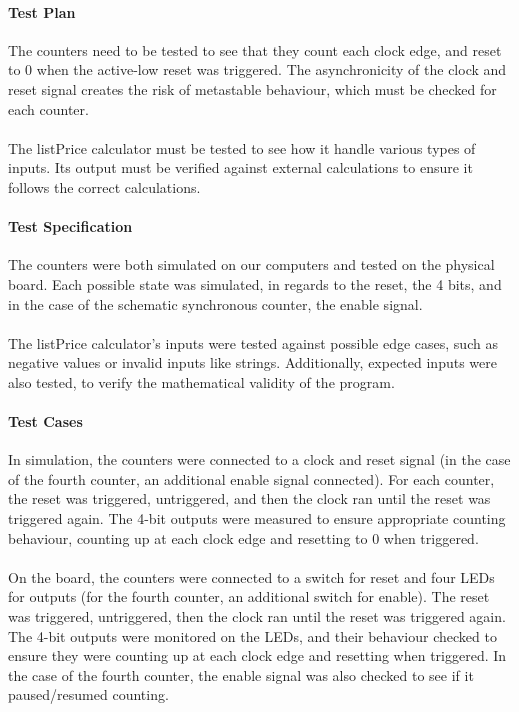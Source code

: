 \documentclass{article}
\begin{document}
  \paragraph{Test Plan} The counters need to be tested to see that they count each clock edge, and reset to 0 when the active-low reset was triggered. The asynchronicity of the clock and reset signal creates the risk of metastable behaviour, which must be checked for each counter.

  \paragraph{} The listPrice calculator must be tested to see how it handle various types of inputs. Its output must be verified against external calculations to ensure it follows the correct calculations.

  \paragraph{Test Specification} The counters were both simulated on our computers and tested on the physical board. Each possible state was simulated, in regards to the reset, the 4 bits, and in the case of the schematic synchronous counter, the enable signal.

  \paragraph{} The listPrice calculator's inputs were tested against possible edge cases, such as negative values or invalid inputs like strings. Additionally, expected inputs were also tested, to verify the mathematical validity of the program.

  \paragraph{Test Cases} In simulation, the counters were connected to a clock and reset signal (in the case of the fourth counter, an additional enable signal connected). For each counter, the reset was triggered, untriggered, and then the clock ran until the reset was triggered again. The 4-bit outputs were measured to ensure appropriate counting behaviour, counting up at each clock edge and resetting to 0 when triggered.

  \paragraph{} On the board, the counters were connected to a switch for reset and four LEDs for outputs (for the fourth counter, an additional switch for enable). The reset was triggered, untriggered, then the clock ran until the reset was triggered again. The 4-bit outputs were monitored on the LEDs, and their behaviour checked to ensure they were counting up at each clock edge and resetting when triggered. In the case of the fourth counter, the enable signal was also checked to see if it paused/resumed counting.
\end{document}
